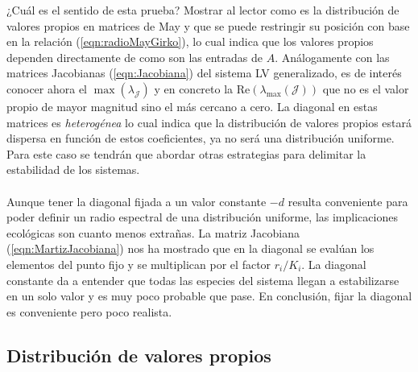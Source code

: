 ¿Cuál es el sentido de esta prueba? Mostrar al lector como es la distribución de valores propios en matrices de May y que se puede restringir su posición con base en la relación (\ref{eqn:radioMayGirko}), lo cual indica que los valores propios dependen directamente de como son las entradas de $A$. Análogamente con las matrices Jacobianas (\ref{eqn:Jacobiana}) del sistema LV generalizado, es de interés conocer ahora el $\max(\lambda_\mathcal{J})$ y en concreto la Re$(\lambda_{\max}(\mathcal{J}))$ que no es el valor propio de mayor magnitud sino el más cercano a cero. La diagonal en estas matrices es \textit{heterogénea} lo cual indica que la distribución de valores propios estará dispersa en función de estos coeficientes, ya no será una distribución uniforme. Para este caso se tendrán que abordar otras estrategias para delimitar la estabilidad de los sistemas.\\
\\
Aunque tener la diagonal fijada a un valor constante $-d$ resulta conveniente para poder definir un radio espectral de una distribución uniforme, las implicaciones ecológicas son cuanto menos extrañas. La matriz Jacobiana (\ref{eqn:MartizJacobiana}) nos ha mostrado que en la diagonal se evalúan los elementos del punto fijo y se multiplican por el factor $r_i/K_i$. La diagonal constante da a entender que todas las especies del sistema llegan a estabilizarse en un solo valor y es muy poco probable que pase. En conclusión, fijar la diagonal es conveniente pero poco realista.

\subsection{Distribución de valores propios}

